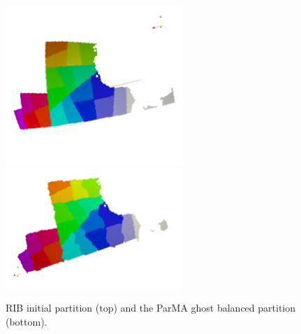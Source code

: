 \documentclass[a4paper]{article}
\begin{document}
\begin{figure}
\includegraphics[width=0.6\textwidth]{60km/init/384_404.png}
\includegraphics[width=0.6\textwidth]{60km/final/384_404.png}
\caption{\label{fig:60km384_404} RIB initial partition (top) and the ParMA ghost balanced partition (bottom).}
\end{figure}
\end{document}
